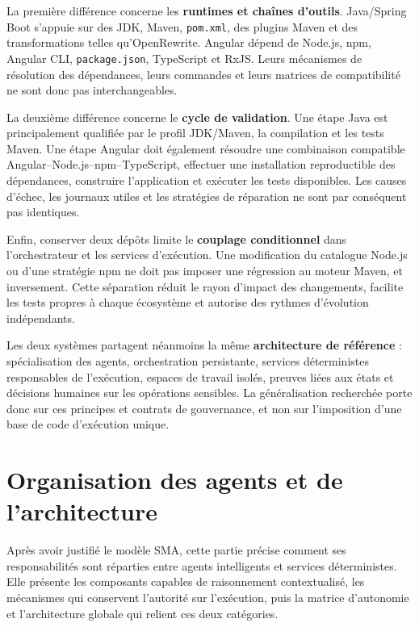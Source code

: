 La première différence concerne les \textbf{runtimes et chaînes d'outils}. Java/Spring Boot s'appuie sur des JDK, Maven, \texttt{pom.xml}, des plugins Maven et des transformations telles qu'OpenRewrite. Angular dépend de Node.js, npm, Angular CLI, \texttt{package.json}, TypeScript et RxJS. Leurs mécanismes de résolution des dépendances, leurs commandes et leurs matrices de compatibilité ne sont donc pas interchangeables.

La deuxième différence concerne le \textbf{cycle de validation}. Une étape Java est principalement qualifiée par le profil JDK/Maven, la compilation et les tests Maven. Une étape Angular doit également résoudre une combinaison compatible Angular--Node.js--npm--TypeScript, effectuer une installation reproductible des dépendances, construire l'application et exécuter les tests disponibles. Les causes d'échec, les journaux utiles et les stratégies de réparation ne sont par conséquent pas identiques.

Enfin, conserver deux dépôts limite le \textbf{couplage conditionnel} dans l'orchestrateur et les services d'exécution. Une modification du catalogue Node.js ou d'une stratégie npm ne doit pas imposer une régression au moteur Maven, et inversement. Cette séparation réduit le rayon d'impact des changements, facilite les tests propres à chaque écosystème et autorise des rythmes d'évolution indépendants.

Les deux systèmes partagent néanmoins la même \textbf{architecture de référence} : spécialisation des agents, orchestration persistante, services déterministes responsables de l'exécution, espaces de travail isolés, preuves liées aux états et décisions humaines sur les opérations sensibles. La généralisation recherchée porte donc sur ces principes et contrats de gouvernance, et non sur l'imposition d'une base de code d'exécution unique.

\section{Organisation des agents et de l'architecture}

Après avoir justifié le modèle SMA, cette partie précise comment ses responsabilités sont réparties entre agents intelligents et services déterministes. Elle présente les composants capables de raisonnement contextualisé, les mécanismes qui conservent l'autorité sur l'exécution, puis la matrice d'autonomie et l'architecture globale qui relient ces deux catégories.

